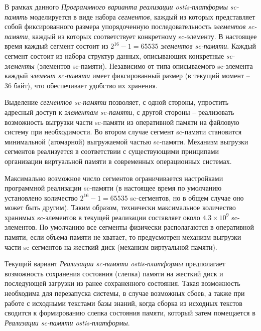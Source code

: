 В рамках данного \textit{Программного варианта реализации ostis-платформы} \textit{sc-память} моделируется в виде набора \textit{сегментов}, каждый из которых представляет собой фиксированного размера упорядоченную последовательность \textit{элементов sc-памяти}, каждый из которых соответствует конкретному sc-элементу. В настоящее время каждый сегмент состоит из $2^{16}-1=65535$ \textit{элементов sc-памяти}. Каждый сегмент состоит из набора структур данных, описывающих конкретные \textit{sc-элементы} (элементов sc-памяти). Независимо от типа описываемого sc-элемента каждый \textit{элемент sc-памяти} имеет фиксированный размер (в текущий момент -- 36 байт), что обеспечивает удобство их хранения.

Выделение \textit{сегментов sc-памяти} позволяет, с одной стороны, упростить адресный доступ к \textit{элементам sc-памяти}, с другой стороны -- реализовать возможность выгрузки части sc-памяти из оперативной памяти на файловую систему при необходимости. Во втором случае сегмент sc-памяти становится минимальной (атомарной) выгружаемой частью sc-памяти. Механизм выгрузки сегментов реализуется в соответствии с существующими принципами организации виртуальной памяти в современных операционных системах.

Максимально возможное число сегментов ограничивается настройками программной реализации sc-памяти (в настоящее время по умолчанию установлено количество $2^{16}-1=65535$ sc-сегментов, но в общем случае оно может быть другим). Таким образом, технически максимальное количество хранимых sc-элементов в текущей реализации составляет около $4.3 \times 10^{9}$ sc-элементов. По умолчанию все сегменты физически располагаются в оперативной памяти, если объема памяти не хватает, то предусмотрен механизм выгрузки части sc-сегментов на жесткий диск (механизм виртуальной памяти).

Текущий вариант \textit{Реализации sc-памяти ostis-платформы} предполагает возможность сохранения состояния (слепка) памяти на жесткий диск и последующей загрузки из ранее сохраненного состояния. Такая возможность необходима для перезапуска системы, в случае возможных сбоев, а также при работе с исходными текстами базы знаний, когда сборка из исходных текстов сводится к формированию слепка состояния памяти, который затем помещается в \textit{Реализации sc-памяти ostis-платформы}.

